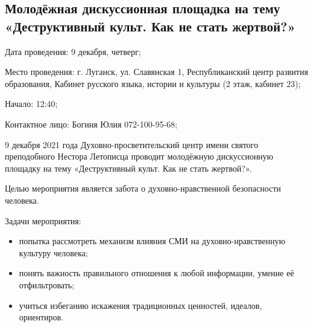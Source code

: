  
 
 
 
 
\subsection{Молодёжная дискуссионная площадка на тему «Деструктивный культ. Как не стать жертвой?»}
\label{sec:09_12_2021.stz.edu.lnr.lgpu.1.molodezh_diskussia_ploschadka}



Дата проведения: 9 декабря, четверг;

Место проведения: г. Луганск, ул. Славянская 1, Республиканский центр развития
образования, Кабинет русского языка, истории и культуры (2 этаж, кабинет 23);

Начало: 12:40;

Контактное лицо: Богиня Юлия 072-100-95-68;


9 декабря 2021 года Духовно-просветительский центр имени святого преподобного
Нестора Летописца проводит молодёжную дискуссионную площадку на тему
«Деструктивный культ. Как не стать жертвой?».

Целью мероприятия является забота о духовно-нравственной безопасности человека.

Задачи мероприятия:

\begin{itemize}
  \item попытка рассмотреть механизм влияния СМИ на духовно-нравственную культуру человека;
  \item понять важность правильного отношения к любой информации, умение её отфильтровать;
  \item учиться избеганию искажения традиционных ценностей, идеалов, ориентиров.
\end{itemize}


